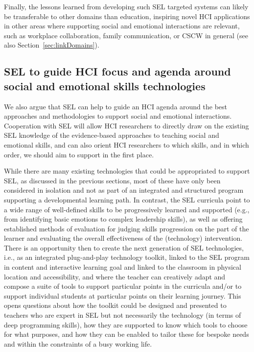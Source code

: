 \documentclass[prodmode,acmtochi]{acmsmall}
\begin{document}
Finally, the lessons learned from developing such SEL targeted systems can likely be transferable to other domains than education, inspiring novel HCI applications in other areas where supporting social and emotional interactions are relevant, such as workplace collaboration, family communication, or CSCW in general (see also Section~\ref{sec:linkDomains}).
%




\subsection{SEL to guide HCI focus and agenda around social and emotional skills technologies }
We also argue that SEL can help to guide an HCI agenda around the best approaches and methodologies to support social and emotional interactions. Cooperation with SEL will allow HCI researchers to directly draw on the existing SEL knowledge of the evidence-based approaches to teaching social and emotional skills, and can also orient HCI researchers to which skills, and in which order, we should aim to support in the first place. 

While there are many existing technologies that could be appropriated to support SEL, as discussed in the previous sections, most of these have only been considered in isolation and not as part of an integrated and structured program supporting a developmental learning path. In contrast, the SEL curricula point to a wide range of well-defined skills to be progressively learned and supported (e.g., from identifying basic emotions to complex leadership skills), as well as offering established methods of evaluation for judging skills progression on the part of the learner and evaluating the overall effectiveness of the (technology) intervention. There is an opportunity then to create the next generation of SEL technologies, i.e., as an integrated plug-and-play technology toolkit, linked to the SEL program in content and interactive learning goal and linked to the classroom in physical location and accessibility, and where the teacher can creatively adapt and compose a suite of tools to support particular points in the curricula and/or to support individual students at particular points on their learning journey.  This opens questions about how the toolkit could be designed and presented to teachers who are expert in SEL but not necessarily the technology (in terms of deep programming skills), how they are supported to know which tools to choose for what purposes, and how they can be enabled to tailor these for bespoke needs and within the constraints of a busy working life.
\end{document}
